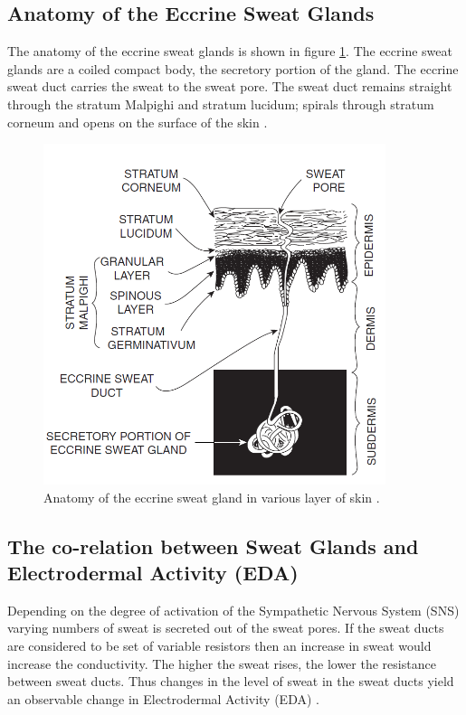 \subsection{Anatomy of the Eccrine Sweat Glands}
The anatomy of the eccrine sweat glands is shown in figure \ref{fig:eccrine_glands}. The eccrine sweat glands are a coiled compact body, the secretory portion of the gland. The eccrine sweat duct carries the sweat to the sweat pore. The sweat duct remains straight through the stratum Malpighi and stratum lucidum; spirals through stratum corneum and opens on the surface of the skin \cite{cacioppo_electrodermal_2016_p_217_243}.
\begin{figure}
    \centering
    \includegraphics[width=100mm]{Figures/eccrine_glands.PNG}
    \caption{Anatomy of the eccrine sweat gland in various layer of skin \cite{hassett_primer_1978}.}
    \label{fig:eccrine_glands}
\end{figure}

\subsection{The co-relation between Sweat Glands and Electrodermal Activity (EDA)}
Depending on the degree of activation of the Sympathetic Nervous System (SNS) varying numbers of sweat is secreted out of the sweat pores. If the sweat ducts are considered to be set of variable resistors then an increase in sweat would increase the conductivity. The higher the sweat rises, the lower the resistance between sweat ducts. Thus changes in the level of sweat in the sweat ducts yield an observable change in Electrodermal Activity (EDA) \cite{cacioppo_electrodermal_2016_p_217_243}.

